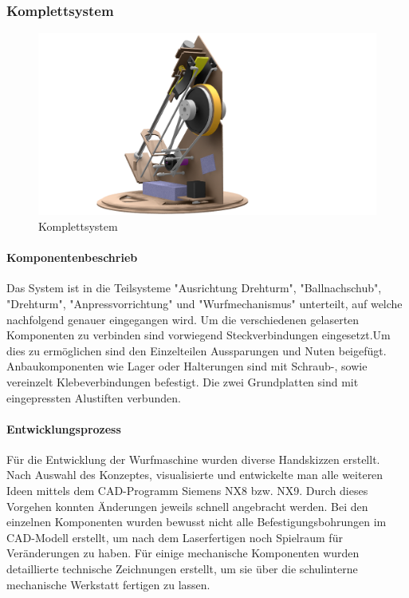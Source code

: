 \subsubsection{Komplettsystem}
\begin{figure}[h!]
	\centering
	\includegraphics[width=\linewidth]{../../fig/Komplettsystem}
	\caption{Komplettsystem}
	\label{fig:Komplettsystem}
\end{figure}
\paragraph{Komponentenbeschrieb}
Das System ist in die Teilsysteme "Ausrichtung Drehturm", "Ballnachschub", "Drehturm", "Anpressvorrichtung" und "Wurfmechanismus" unterteilt, auf welche nachfolgend genauer eingegangen wird. Um die verschiedenen gelaserten Komponenten zu verbinden sind vorwiegend Steckverbindungen eingesetzt.Um dies zu ermöglichen sind den Einzelteilen Aussparungen und Nuten beigefügt. Anbaukomponenten wie Lager oder Halterungen sind mit Schraub-, sowie vereinzelt Klebeverbindungen befestigt. Die zwei Grundplatten sind mit eingepressten Alustiften verbunden.

\paragraph{Entwicklungsprozess}
Für die Entwicklung der Wurfmaschine wurden diverse Handskizzen erstellt. Nach Auswahl des Konzeptes, visualisierte und entwickelte man alle weiteren Ideen mittels dem CAD-Programm Siemens NX8 bzw. NX9. Durch dieses Vorgehen konnten Änderungen jeweils schnell angebracht werden. Bei den einzelnen Komponenten wurden bewusst nicht alle Befestigungsbohrungen im CAD-Modell erstellt, um nach dem Laserfertigen noch Spielraum für Veränderungen zu haben. Für einige mechanische Komponenten wurden detaillierte technische Zeichnungen erstellt, um sie über die schulinterne mechanische Werkstatt fertigen zu lassen.
